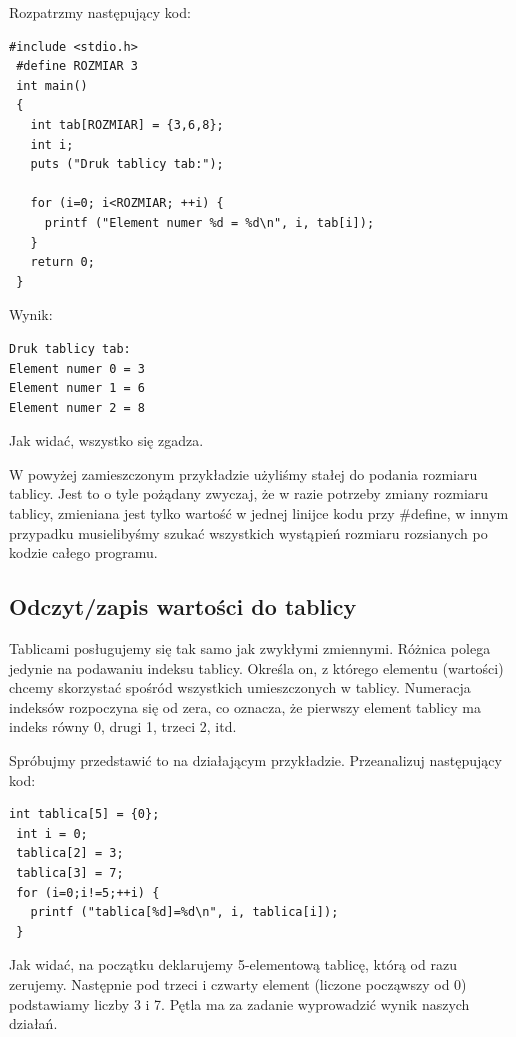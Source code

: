 \documentclass[a4paper,12pt]{article}
\begin{document}
Rozpatrzmy następujący kod:
\begin{lstlisting}[caption=Printowanie tablicy, captionpos=t, label=src:sqrt, frame=lBTr, frameround=ffff, captionpos=b ]
 #include <stdio.h>
 #define ROZMIAR 3
 int main()
 {
   int tab[ROZMIAR] = {3,6,8};
   int i;
   puts ("Druk tablicy tab:");
 
   for (i=0; i<ROZMIAR; ++i) {
     printf ("Element numer %d = %d\n", i, tab[i]);
   }
   return 0;
 }
\end{lstlisting}

Wynik:
\begin{lstlisting}[caption=Wyniki, captionpos=t, label=src:sqrt, frame=lBTr, frameround=ffff, captionpos=b ]
Druk tablicy tab:
Element numer 0 = 3
Element numer 1 = 6
Element numer 2 = 8
\end{lstlisting}
Jak widać, wszystko się zgadza.

W powyżej zamieszczonym przykładzie użyliśmy stałej do podania rozmiaru tablicy. Jest to o tyle pożądany zwyczaj, że w razie potrzeby zmiany rozmiaru tablicy, zmieniana jest tylko wartość w jednej linijce kodu przy {\#}define, w innym przypadku musielibyśmy szukać wszystkich wystąpień rozmiaru rozsianych po kodzie całego programu.

\subsection*{Odczyt/zapis wartości do tablicy}
Tablicami posługujemy się tak samo jak zwykłymi zmiennymi. Różnica polega jedynie na podawaniu indeksu tablicy. Określa on, z którego elementu (wartości) chcemy skorzystać spośród wszystkich umieszczonych w tablicy. Numeracja indeksów rozpoczyna się od zera, co oznacza, że pierwszy element tablicy ma indeks równy 0, drugi 1, trzeci 2, itd.

Spróbujmy przedstawić to na działającym przykładzie. Przeanalizuj następujący kod:

\begin{lstlisting}[caption=Fragment, captionpos=t, label=src:sqrt, frame=lBTr, frameround=ffff, captionpos=b ]
 int tablica[5] = {0};
 int i = 0;
 tablica[2] = 3;
 tablica[3] = 7;
 for (i=0;i!=5;++i) {
   printf ("tablica[%d]=%d\n", i, tablica[i]);
 }

\end{lstlisting}
Jak widać, na początku deklarujemy 5-elementową tablicę, którą od razu zerujemy. Następnie pod trzeci i czwarty element (liczone począwszy od 0) podstawiamy liczby 3 i 7. Pętla ma za zadanie wyprowadzić wynik naszych działań.
\end{document}
